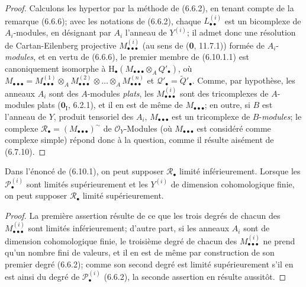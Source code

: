 \begin{proof}
Calculons les hypertor par la méthode de (6.6.2), en tenant compte de la remarque
(6.6.6); avec les notations de (6.6.2), chaque
$L_{\bullet\bullet}^{(i)}$ est un bicomplexe de $A_i$-modules, en désignant par
$A_i$ l'anneau de $Y^{(i)}$; il admet donc une résolution de Cartan-Eilenberg
projective $M_{\bullet\bullet\bullet}^{(i)}$ (au sens de (\textbf{0}, 11.7.1)) formée de
$A_i$-\emph{modules}, et en vertu de (6.6.6), le premier membre de (6.10.1.1) est
canoniquement isomorphe à
$\mathrm H_\bullet(M_{\bullet\bullet\bullet}\otimes_A Q'_\bullet)$, où
$M_{\bullet\bullet\bullet}=M_{\bullet\bullet\bullet}^{(1)}\otimes_A M_{\bullet\bullet\bullet}^{(2)}\otimes\ldots\otimes_A M_{\bullet\bullet\bullet}^{(n)}$
et $\mathscr Q'_\bullet=\widetilde{Q}'_\bullet$. Comme, par hypothèse, les
anneaux $A_i$ sont des $A$-modules \emph{plats}, les
$M_{\bullet\bullet\bullet}^{(i)}$ sont des tricomplexes de $A$-modules plats
($\mathbf{0}_{\mathrm I}$, 6.2.1), et il en est de même de
$M_{\bullet\bullet\bullet}$; en outre, si $B$ est l'anneau de $Y$, produit
tensoriel des $A_i$, $M_{\bullet\bullet\bullet}$ est un tricomplexe de
$B$-\emph{modules}; le complexe
$\mathscr R_\bullet=(M_{\bullet\bullet\bullet})^\sim$ de $\mathscr O_Y$-Modules (où $M_{\bullet\bullet\bullet}$ est considéré comme
complexe simple) répond donc à la question, comme il résulte aisément de
(6.7.10).
\end{proof}

\begin{corollary}[6.10.2]
Dans l'énoncé de (6.10.1), on peut supposer $\mathscr R_\bullet$ limité
inférieurement. Lorsque les $\mathscr P_\bullet^{(i)}$ sont limités
supérieurement et les $Y^{(i)}$ de dimension cohomologique finie, on peut
supposer $\mathscr R_\bullet$ limité supérieurement.
\end{corollary}

\begin{proof}
La première assertion résulte de ce que les trois degrés de chacun des
$M_{\bullet\bullet\bullet}^{(i)}$ sont limités inférieurement; d'autre part, si
les anneaux $A_i$ sont de dimension cohomologique finie, le troisième degré de
chacun des $M_{\bullet\bullet\bullet}^{(i)}$ ne prend qu'un nombre fini de
valeurs, et il en est de même par construction de son premier degré (6.6.2);
comme son second degré est limité supérieurement s'il en est ainsi du degré de
$\mathscr P_\bullet^{(i)}$ (6.6.2), la seconde assertion en résulte aussitôt.
\end{proof}

